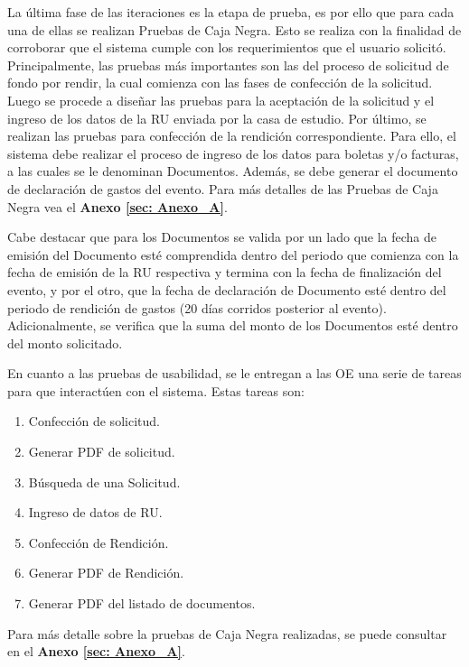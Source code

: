La última fase de las iteraciones es la etapa de prueba, es por ello que para cada una de ellas se realizan Pruebas de Caja Negra. Esto se realiza con la finalidad de corroborar que el sistema cumple con los requerimientos que el usuario solicitó. Principalmente, las pruebas más importantes son las del proceso de solicitud de fondo por rendir, la cual comienza con las fases de confección de la solicitud. Luego se procede a diseñar las pruebas para la aceptación de la solicitud y el ingreso de los datos de la RU enviada por la casa de estudio. Por último, se realizan las pruebas para confección de la rendición correspondiente. Para ello, el sistema debe realizar el proceso de ingreso de los datos para boletas y/o facturas, a las cuales se le denominan Documentos. Además, se debe generar el documento de declaración de gastos del evento. Para más detalles de las Pruebas de Caja Negra vea el \textbf{Anexo \ref{sec: Anexo_A}}.

Cabe destacar que para los Documentos se valida por un lado que la fecha de emisión del Documento esté comprendida dentro del periodo que comienza con la fecha de emisión de la RU respectiva y termina con la fecha de finalización del evento, y por el otro, que la fecha de declaración de Documento esté dentro del periodo de rendición de gastos (20 días corridos posterior al evento). Adicionalmente, se verifica que la suma del monto de los Documentos esté dentro del monto solicitado. 

En cuanto a las pruebas de usabilidad, se le entregan a las OE una serie de tareas para que interactúen con el sistema. Estas tareas son: 

\begin{enumerate}
    \item Confección de solicitud.
    \item Generar PDF de solicitud.
    \item Búsqueda de una Solicitud.
    \item Ingreso de datos de RU.
    \item Confección de Rendición.
    \item Generar PDF de Rendición.
    \item Generar PDF del listado de documentos.
\end{enumerate}

Para más detalle sobre la pruebas de Caja Negra realizadas, se puede consultar en el \textbf{Anexo \ref{sec: Anexo_A}}.

